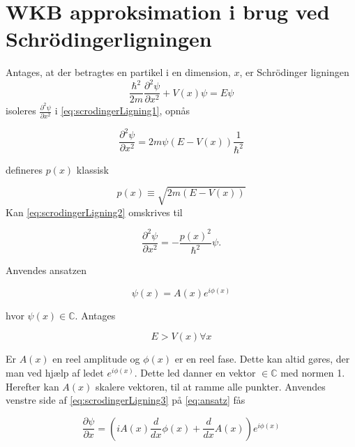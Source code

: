 \section{WKB approksimation i brug ved Schrödingerligningen}
Antages, at der betragtes en partikel i en dimension, $x$,  er Schrödinger ligningen
%
\begin{equation}
    \frac{\hbar^2}{2m}\frac{\partial^2 \psi}{\partial x^2} + V(x) \psi = E \psi
    \label{eq:scrodingerLigning1}
\end{equation}
%
isoleres $\frac{\partial^2 \psi}{\partial x^2}$ i \cref{eq:scrodingerLigning1}, opnås

\begin{equation}
    \frac{\partial^2 \psi}{\partial x^2} = 2m\psi (E  - V(x)) \frac{1}{\hbar^2}
    \label{eq:scrodingerLigning2}
\end{equation}

defineres $p(x)$ klassisk

\begin{equation}
p(x) \equiv \sqrt{2m(E-V(x))}
\end{equation}
Kan \cref{eq:scrodingerLigning2} omskrives til

\begin{equation}
    \frac{\partial^2 \psi}{\partial x^2} = - \frac{p(x)^2}{\hbar^2} \psi.
    \label{eq:scrodingerLigning3}
\end{equation}

Anvendes ansatzen

\begin{equation}
    \psi(x) = A(x) e^{i \phi(x)}
    \label{eq:ansatz}
\end{equation}

hvor $\psi (x) \in \mathbb{C}$. Antages

\begin{equation}
 E > V(x) \forall x
\end{equation}

Er $A(x)$ en reel amplitude og $\phi(x)$ er en reel fase. Dette kan altid gøres, der man ved hjælp af ledet  $e^{i \phi(x)} $. Dette led danner en vektor $ \in \mathbb{C}$ med normen 1. Herefter kan $A(x)$  skalere vektoren, til at ramme alle punkter. Anvendes venstre side af \cref{eq:scrodingerLigning3} på \cref{eq:ansatz} fås

\begin{equation}
    \frac{\partial \psi}{\partial x} = \left(i A{\left (x \right )} \frac{d}{d x} \phi{\left (x \right )} + \frac{d}{d x} A{\left (x \right )}\right) e^{i \phi{\left (x \right )}}
    \label{eq:diff1gange}
\end{equation}

